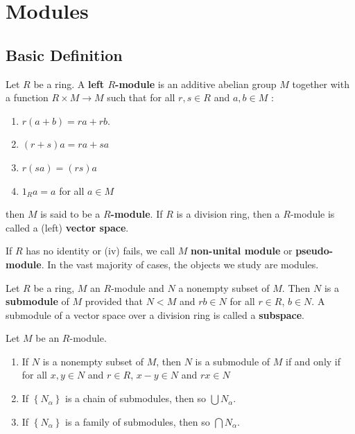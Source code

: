 \chapter{Modules}

\section{Basic Definition} %
\begin{definition}
    Let $R$ be a ring.
    A \textbf{left $R$-module} is an additive abelian group $M$ together with a function $R \times M \rightarrow M$  such that for all $ {r},  {s} \in  {R}$ and $ {a},  {b} \in  M$ :
    \begin{enumerate}[label=(\roman*)]
        \item
              $r(a+b)=r a+r b$.
        \item
              $( {r}+ {s})  {a}= {ra}+ {sa}$
        \item
              $ {r}( {sa})=( {rs})  {a}$
        \item
              $1_{{R}}  {a}= {a}$ for all $ {a} \in  M$
    \end{enumerate}
    then $M$ is said to be a \textbf{$R$-module}. If $R$ is a division ring, then a $R$-module is called a (left) \textbf{vector space}.
    \begin{remark}
        If $R$ has no identity or (iv) fails, we call $M$ \textbf{non-unital module} or \textbf{pseudo-module}.
        In the vast majority of cases, the objects we study are modules.
    \end{remark}
\end{definition}

\begin{definition}
    Let $R$ be a ring, $M$ an $R$-module and $N$ a nonempty subset of $M$. Then $N$ is a \textbf{submodule} of $M$ provided that $N<M$ and $  {rb} \in N$ for all $r \in R$, $  {b} \in   N$.
    A submodule of a vector space over a division ring is called a \textbf{subspace}.
\end{definition}

\begin{proposition}
    Let $M$ be an $R$-module.
    \begin{enumerate}
        \item
              If $N$ is a nonempty subset of $M$, then $N$ is a submodule of $M$ if and only if for all $x, y \in N$ and $r \in R$, $x-y \in N$ and $r x \in N$
        \item
              If $\left\{N_\alpha\right\}$ is a chain of submodules, then so $\bigcup N_\alpha$.
        \item
              If $\left\{N_\alpha\right\}$ is a family of submodules, then so $\bigcap N_\alpha$.
    \end{enumerate}
\end{proposition}
















